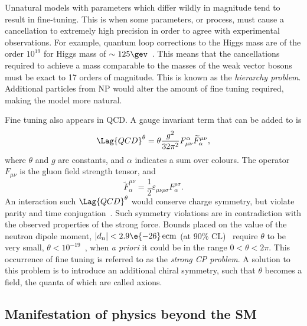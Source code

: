 Unnatural models with parameters which differ wildly in magnitude tend to result in fine-tuning.
This is when some parameters, or process, must cause a cancellation to extremely high precision in
order to agree with experimental observations.
For example, quantum loop corrections to the Higgs mass are of the order $10^{19}$ for Higgs mass
of $\sim125\gev$~\cite{Chatrchyan:2012ufa,Aad:2012tfa}.
This means that the cancellations required to achieve a mass comparable to the masses of the weak
vector bosons must be exact to 17 orders of magnitude.
This is known as the \emph{hierarchy problem}.
Additional particles from NP would alter the amount of fine tuning required, making the model more
natural.

Fine tuning also appears in QCD.
A gauge invariant term that can be added to  is
\begin{equation}
  \Lag{QCD}^\theta = \theta\frac{g^2}{32\pi^2}
  F_{\mu\nu}^\alpha\widetilde F^{\mu\nu}_\alpha,
\end{equation}
where $\theta$ and $g$ are constants, and $\alpha$ indicates a sum over colours.
The operator $F_{\mu\nu}$ is the gluon field strength tensor, and
\begin{equation}
  \widetilde F^{\mu\nu}_\alpha = \frac12\varepsilon_{\mu\nu\rho\sigma}F^{\rho\sigma}_\alpha.
\end{equation}
An interaction such $\Lag{QCD}^\theta$ would conserve charge symmetry, but violate parity and time
conjugation~\cite{Peccei:2006as}.
Such symmetry violations are in contradiction with the observed properties of the strong
force.
Bounds placed on the value of the neutron dipole moment, $|d_n| <2.9\e{-26}\,\mathrm{ecm}$
(at 90\% CL)~\cite{Baker:2006ts} require $\theta$ to be very small,
$\theta<10^{-19}$~\cite{Crewther:PQref9}, when \emph{a priori} it could be in the range
$0<\theta<2\pi$.
This occurrence of fine tuning is referred to as the \emph{strong CP problem}.
A solution to this problem is to introduce an additional chiral symmetry, such that $\theta$
becomes a field, the quanta of which are called axions.



\subsection{Manifestation of physics beyond the SM}
\label{sec:th:bsm:man}

